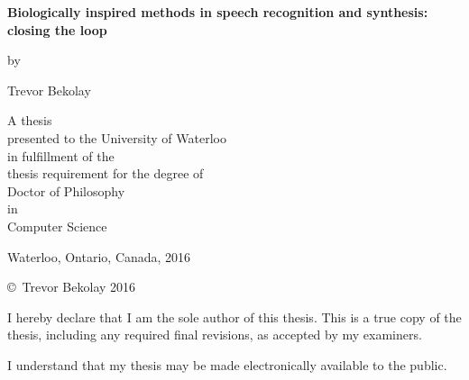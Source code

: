 \pagestyle{empty}

\begin{titlepage}
  \begin{center}
    \vspace*{1.0cm}

    \Huge
    {\bf Biologically inspired methods in speech recognition and synthesis: \\
    closing the loop}

    \vspace*{1.0cm}

    \normalsize
    by \\

    \vspace*{1.0cm}

    \Large
    Trevor Bekolay \\

    \vspace*{3.0cm}

    \normalsize
    A thesis \\
    presented to the University of Waterloo \\
    in fulfillment of the \\
    thesis requirement for the degree of \\
    Doctor of Philosophy \\
    in \\
    Computer Science \\

    \vspace*{2.0cm}

    Waterloo, Ontario, Canada, 2016 \\

    \vspace*{1.0cm}

    \copyright\ Trevor Bekolay 2016 \\
  \end{center}
\end{titlepage}

\pagestyle{plain}
\setcounter{page}{2}

\cleardoublepage
{}
{}

\noindent
I hereby declare that I am the sole author of this thesis. This is a
true copy of the thesis, including any required final revisions, as
accepted by my examiners.

\bigskip

\noindent
I understand that my thesis may be made electronically available to
the public.

\cleardoublepage

